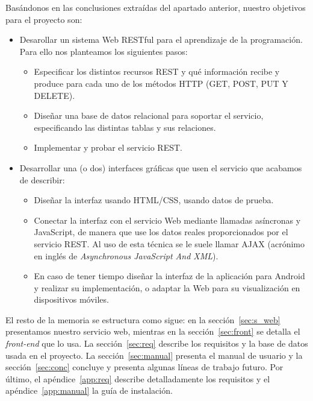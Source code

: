 Basándonos en las conclusiones extraídas del apartado anterior, nuestro objetivos para el proyecto son:

\begin{itemize}
\item
Desarollar un sistema Web RESTful para el aprendizaje de la programación. Para ello nos planteamos los siguientes pasos:

\begin{itemize}
\item
Especificar los distintos recursos REST y qué información recibe y produce para cada uno de los métodos HTTP (GET, POST, PUT Y DELETE).

\item
Diseñar una base de datos relacional para soportar el servicio, especificando las distintas tablas y sus relaciones.

\item
Implementar y probar el servicio REST.

\end{itemize}

\item
Desarrollar una (o dos) interfaces gráficas que usen el servicio que acabamos de describir:

\begin{itemize}
\item
Diseñar la interfaz usando HTML/CSS, usando datos de prueba.

\item
Conectar la interfaz con el servicio Web mediante llamadas asíncronas y JavaScript, de manera que use los datos reales proporcionados por el servicio REST. Al uso de esta técnica se le suele llamar AJAX (acrónimo en inglés de  \emph{Asynchronous JavaScript And XML}).

\item
En caso de tener tiempo diseñar la interfaz de la aplicación para Android y realizar su implementación, o adaptar la Web para su visualización en dispositivos móviles.

\end{itemize}

\end{itemize}

El resto de la memoria se estructura como sigue: en la sección~\ref{sec:s_web} presentamos nuestro
servicio web, mientras en la sección~\ref{sec:front} se detalla el \emph{front-end} que lo usa.
La sección~\ref{sec:req} describe los requisitos y la base de datos usada en el proyecto. La
sección~\ref{sec:manual} presenta el manual de usuario y la sección~\ref{sec:conc} concluye y
presenta algunas líneas de trabajo futuro.
Por último, el apéndice~\ref{app:req} describe detalladamente los requisitos y el
apéndice~\ref{app:manual} la guía de instalación.

